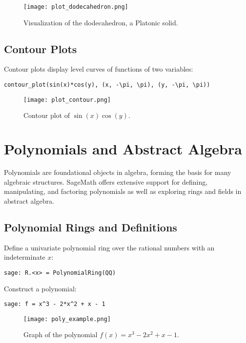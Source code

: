 \documentclass[12pt]{book}
\begin{document}
\begin{figure}[H]
  \centering
  \texttt{[image: plot\_dodecahedron.png]}
  \caption{Visualization of the dodecahedron, a Platonic solid.}
  \label{fig:plot_dodecahedron}
\end{figure}

\section{Contour Plots}

Contour plots display level curves of functions of two variables:

\begin{verbatim}
contour_plot(sin(x)*cos(y), (x, -\pi, \pi), (y, -\pi, \pi))
\end{verbatim}

\begin{figure}[H]
  \centering
  \texttt{[image: plot\_contour.png]}
  \caption{Contour plot of \( \sin(x) \cos(y) \).}
  \label{fig:plot_contour}
\end{figure}

\chapter{Polynomials and Abstract Algebra}

Polynomials are foundational objects in algebra, forming the basis for many algebraic structures. SageMath offers extensive support for defining, manipulating, and factoring polynomials as well as exploring rings and fields in abstract algebra.

\section{Polynomial Rings and Definitions}

Define a univariate polynomial ring over the rational numbers with an indeterminate \(x\):

\begin{verbatim}
sage: R.<x> = PolynomialRing(QQ)
\end{verbatim}

Construct a polynomial:

\begin{verbatim}
sage: f = x^3 - 2*x^2 + x - 1
\end{verbatim}

\begin{figure}[H]
  \centering
  \texttt{[image: poly\_example.png]}
  \caption{Graph of the polynomial \( f(x) = x^3 - 2x^2 + x - 1 \).}
  \label{fig:poly_example}
\end{figure}
\end{document}
